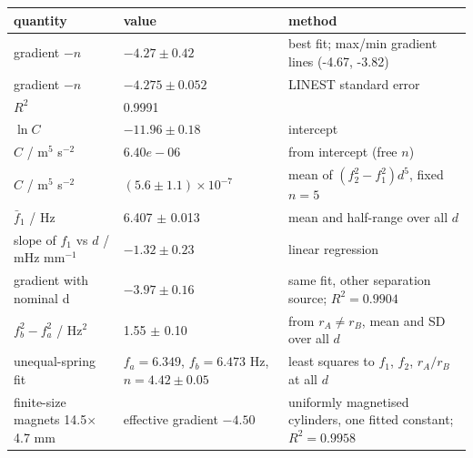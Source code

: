 \begin{tabular}{@{}lll@{}}
\toprule
quantity & value & method \\
\midrule
gradient $-n$ & $-4.27 \pm 0.42$ & best fit; max/min gradient lines (-4.67, -3.82) \\
gradient $-n$ & $-4.275 \pm 0.052$ & LINEST standard error \\
$R^2$ & 0.9991 & \\
$\ln C$ & $-11.96 \pm 0.18$ & intercept \\
$C$ / m$^5$ s$^{-2}$ & $6.40e-06$ & from intercept (free $n$) \\
$C$ / m$^5$ s$^{-2}$ & $(5.6 \pm 1.1)\times 10^{-7}$ & mean of $(f_2^2-f_1^2)d^5$, fixed $n=5$ \\
$\bar f_1$ / Hz & 6.407 $\pm$ 0.013 & mean and half-range over all $d$ \\
slope of $f_1$ vs $d$ / mHz mm$^{-1}$ & $-1.32 \pm 0.23$ & linear regression \\
gradient with nominal d & $-3.97 \pm 0.16$ & same fit, other separation source; $R^2=0.9904$ \\
$f_b^2-f_a^2$ / Hz$^2$ & 1.55 $\pm$ 0.10 & from $r_A\neq r_B$, mean and SD over all $d$ \\
unequal-spring fit & $f_a=6.349$, $f_b=6.473$ Hz, $n=4.42\pm0.05$ & least squares to $f_1$, $f_2$, $r_A/r_B$ at all $d$ \\
finite-size magnets 14.5$\times$4.7 mm & effective gradient $-4.50$ & uniformly magnetised cylinders, one fitted constant; $R^2=0.9958$ \\
\bottomrule
\end{tabular}